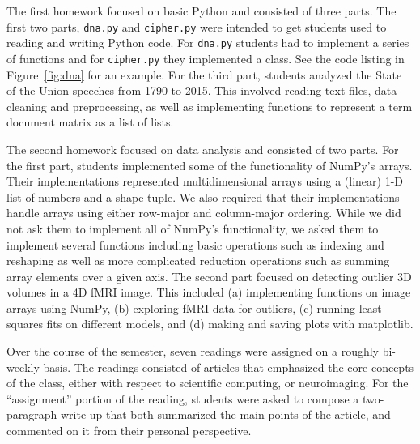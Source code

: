 The first homework focused on basic Python and consisted of three parts.
The first two parts, \texttt{dna.py} and \texttt{cipher.py}
were intended to get students used to reading and writing Python code.
For \texttt{dna.py} students had to implement a series of functions and for
\texttt{cipher.py} they implemented a class.
See the code listing in Figure~\ref{fig:dna} for an example.
For the third part, students analyzed the State of the Union
speeches from 1790 to 2015.
This involved reading text files, data cleaning and preprocessing, as well
as implementing functions to represent a term document matrix as a list of
lists.

The second homework focused on data analysis and consisted of two parts. 
For the first part, students implemented some of the functionality of NumPy's arrays.
Their implementations represented multidimensional arrays using a (linear) 1-D list
of numbers and a shape tuple.
We also required that their implementations handle arrays using either
row-major and column-major ordering.
While we did not ask them to implement all of NumPy's functionality,
we asked them to implement several functions including basic operations
such as indexing and reshaping as well as more complicated
reduction operations such as summing array elements over a given axis. 
The second part focused on detecting outlier 3D volumes in a 4D fMRI image.
This included
(a) implementing functions on image arrays using NumPy,
(b) exploring fMRI data for outliers,
(c) running least-squares fits on different models, and
(d) making and saving plots with matplotlib.

Over the course of the semester, seven readings were assigned on a roughly
bi-weekly basis.
The readings consisted of articles that emphasized the core concepts
of the class, either with respect to scientific computing, or neuroimaging.
For the ``assignment'' portion of the reading, students were asked to compose
a two-paragraph write-up that both summarized the main points of the article,
and commented on it from their personal perspective.

